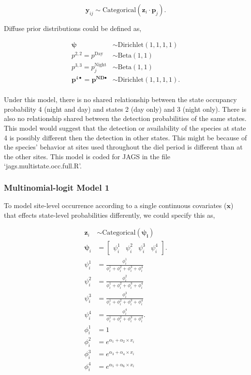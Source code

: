 \documentclass[12pt]{article}
\begin{document}
\begin{equation}
\textbf{y}_{ij} \sim \text{Categorical}(\textbf{z}_{i} \cdot \boldsymbol{p}_{j}).
\end{equation}

Diffuse prior distributions could be defined as,
\begin{center}
\begin{align*}
\boldsymbol{\psi} &\sim \text{Dirichlet}(1,1,1,1)\\
p^{2,2}= p^{\text{Day}} &\sim \text{Beta}(1,1)\\
p^{3,3} = p_{j}^{\text{Night}}  &\sim \text{Beta}(1,1)\\
\boldsymbol{p}^{4 \bullet} = \boldsymbol{p^{\text{ND}\bullet}} &\sim \text{Dirichlet}(1,1,1,1).\\
\end{align*}
\end{center}

Under this model, there is no shared relationship between the state occupancy probability 4 (night and day) and states 2 (day only) and 3 (night only). There is also no relationship shared between the detection probabilities of the same states. This model would suggest that the detection or availability of the species at state 4 is possibly different then the detection in other states. This might be because of the species' behavior at sites used throughout the diel period is different than at the other sites. This model is coded for JAGS in the file `jags.multistate.occ.full.R'.

\subsubsection{Multinomial-logit Model 1}
To model site-level occurrence according to a single continuous covariates ($\mathbf{x}$) that effects state-level probabilities differently, we could specify this as,
\begin{center}
\begin{align*}
\textbf{z}_{i} &\sim \text{Categorical}(\boldsymbol{\psi_{i}})\\
\boldsymbol{\psi}_{i} &= \begin{bmatrix} \psi^1_{i} & \psi^2_{i} & \psi^3_{i} & \psi^4_{i} \end{bmatrix}.\\
\psi^1_{i} &=\frac{\phi^1_{i}}{\phi^1_{i}+ \phi^2_{i}+\phi^3_{i}+\phi^4_{i}}\\
\psi^2_{i} &=\frac{\phi^2_{i}}{\phi^1_{i}+ \phi^2_{i}+\phi^3_{i}+\phi^4_{i}}\\
\psi^3_{i} &=\frac{\phi^3_{i}}{\phi^1_{i}+ \phi^2_{i}+\phi^3_{i}+\phi^4_{i}}\\
\psi^4_{i} &=\frac{\phi^4_{i}}{\phi^1_{i}+ \phi^2_{i}+\phi^3_{i}+\phi^4_{i}}.\\
\phi^1_{i} &= 1\\
\phi^2_{i} &= e^{\alpha_{1}+\alpha_{2}\times x_{i}}\\
\phi^3_{i} &= e^{\alpha_{3}+\alpha_{4}\times x_{i}}\\
\phi^4_{i} &= e^{\alpha_{5}+\alpha_{6}\times x_{i}}\\
\end{align*}
\end{center}
\end{document}
